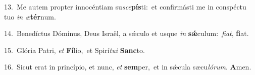 {\numbfont\textcolor{\numbcolor}{13.}}~Me autem propter innocéntiam su\-\textit{sce}\-\textbf{pís}ti:~\star et confirmásti me in conspéctu tuo \textit{in} \textit{æ}\-\textbf{tér}num.\par
{\numbfont\textcolor{\numbcolor}{14.}}~Benedíctus Dóminus, Deus Israël, a sǽculo et usque \textit{in} \textbf{sǽ}\-culum:~\star \textit{fi}\-\textit{at}, \textbf{fi}\-at.\par
{\numbfont\textcolor{\numbcolor}{15.}}~Glória Patri, \textit{et} \textbf{Fí}\-lio,~\star et Spirí\-\textit{tu}\-\textit{i} \textbf{Sanc}\-to.\par
{\numbfont\textcolor{\numbcolor}{16.}}~Sicut erat in princípio, et nunc, \textit{et} \textbf{sem}\-per,~\star et in sǽcula sæcu\-\textit{ló}\-\textit{rum}. \textbf{A}\-men.\par
